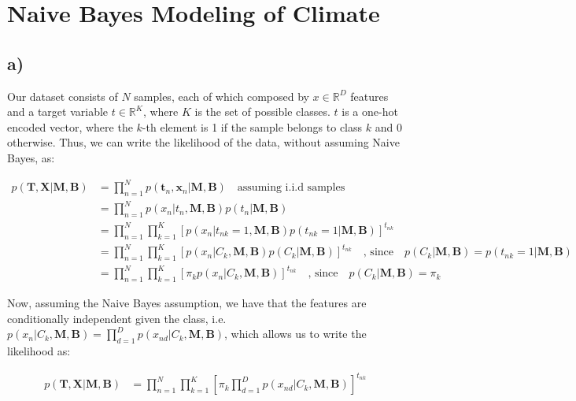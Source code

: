 \documentclass[12pt,a4paper,oneside]{paper}
\begin{document}
\pagestyle{plain}


\def\title {Homework Assignment 2}

 
\cleardoublepage
{}\selectfont
\setcounter{page}{0}
\tableofcontents
\newpage

\small

\section{Naive Bayes Modeling of Climate}

\subsection*{a)}

Our dataset consists of $N$ samples, each of which composed by $x \in \mathbb{R}^{D}$ features
and a target variable $t \in \mathbb{R}^K$, where $K$ is the set of possible classes. $t$ is a one-hot encoded vector,
where the $k$-th element is 1 if the sample belongs to class $k$ and 0 otherwise.
Thus, we can write the likelihood of the data, without assuming Naive Bayes, as:

\begin{align*}
    p(\bm{T}, \bm{X} | \bm{M}, \bm{B}) &= \prod_{n=1}^{N} p(\bm{t}_n, \bm{x}_n | \bm{M}, \bm{B}) \quad \text{assuming i.i.d samples} \\
    &= \prod_{n=1}^{N} p(x_n | t_n, \bm{M}, \bm{B}) p(t_n | \bm{M}, \bm{B}) \\
    &= \prod_{n=1}^{N} \prod_{k=1}^{K} [p(x_n | t_{nk} = 1, \bm{M}, \bm{B}) p(t_{nk} = 1 | \bm{M}, \bm{B})]^{t_{nk}} \\
    &= \prod_{n=1}^{N} \prod_{k=1}^{K} [p(x_n | C_k, \bm{M}, \bm{B}) p(C_k | \bm{M}, \bm{B})]^{t_{nk}} \quad \text{, since} \quad p(C_k | \bm{M}, \bm{B}) = p(t_{nk} = 1 | \bm{M}, \bm{B}) \\
    &= \prod_{n=1}^{N} \prod_{k=1}^{K} [\pi_k p(x_n | C_k, \bm{M}, \bm{B})]^{t_{nk}} \quad \text{, since} \quad p(C_k | \bm{M}, \bm{B}) = \pi_k
\end{align*}

Now, assuming the Naive Bayes assumption, we have that the features are conditionally independent given the class, i.e. $p(x_n | C_k, \bm{M}, \bm{B}) = \prod_{d=1}^{D} p(x_{nd} | C_k, \bm{M}, \bm{B})$, 
which allows us to write the likelihood as:

\begin{align*}
    p(\bm{T}, \bm{X} | \bm{M}, \bm{B}) &= \prod_{n=1}^{N} \prod_{k=1}^{K} [\pi_k \prod_{d=1}^{D} p(x_{nd} | C_k, \bm{M}, \bm{B})]^{t_{nk}}
\end{align*}
\end{document}
